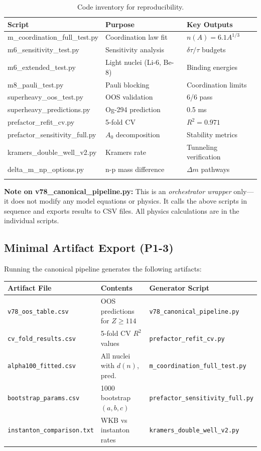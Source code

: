 \documentclass[11pt,a4paper]{article}
\begin{document}
\begin{longtable}{p{5cm}p{6cm}p{3cm}}
\toprule
\textbf{Script} & \textbf{Purpose} & \textbf{Key Outputs} \\
\midrule
\endhead
m\_coordination\_full\_test.py & Coordination law fit & $n(A) = 6.1 A^{1/3}$ \\
m6\_sensitivity\_test.py & Sensitivity analysis & $\delta\tau/\tau$ budgets \\
m6\_extended\_test.py & Light nuclei (Li-6, Be-8) & Binding energies \\
m8\_pauli\_test.py & Pauli blocking & Coordination limits \\
superheavy\_oos\_test.py & OOS validation & 6/6 pass \\
superheavy\_predictions.py & Og-294 prediction & 0.5 ms \\
prefactor\_refit\_cv.py & 5-fold CV & $R^2 = 0.971$ \\
prefactor\_sensitivity\_full.py & $A_0$ decomposition & Stability metrics \\
kramers\_double\_well\_v2.py & Kramers rate & Tunneling verification \\
delta\_m\_np\_options.py & n-p mass difference & $\Delta m$ pathways \\
\bottomrule
\caption{Code inventory for reproducibility.}
\end{longtable}

\textbf{Note on v78\_canonical\_pipeline.py:} This is an \emph{orchestrator wrapper} only---it does not modify any model equations or physics. It calls the above scripts in sequence and exports results to CSV files. All physics calculations are in the individual scripts.

\subsection{Minimal Artifact Export (P1-3)}

Running the canonical pipeline generates the following artifacts:

\begin{center}
\begin{tabular}{lll}
\toprule
\textbf{Artifact File} & \textbf{Contents} & \textbf{Generator Script} \\
\midrule
\texttt{v78\_oos\_table.csv} & OOS predictions for $Z \geq 114$ & \texttt{v78\_canonical\_pipeline.py} \\
\texttt{cv\_fold\_results.csv} & 5-fold CV $R^2$ values & \texttt{prefactor\_refit\_cv.py} \\
\texttt{alpha100\_fitted.csv} & All nuclei with $d(n)$, pred. & \texttt{m\_coordination\_full\_test.py} \\
\texttt{bootstrap\_params.csv} & 1000 bootstrap $(a,b,c)$ & \texttt{prefactor\_sensitivity\_full.py} \\
\texttt{instanton\_comparison.txt} & WKB vs instanton rates & \texttt{kramers\_double\_well\_v2.py} \\
\bottomrule
\end{tabular}
\end{center}
\end{document}
